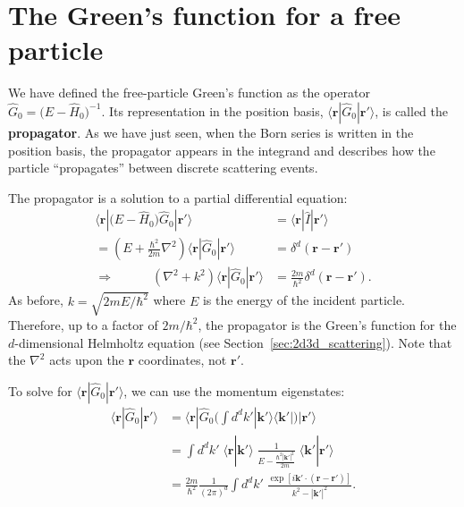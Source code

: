 \documentclass[pra,12pt]{revtex4}
\begin{document}
\section{The Green's function for a free particle}
\label{sec:freegreen}

We have defined the free-particle Green's function as the operator
$\hat{G}_0=\big(E-\hat{H}_0\big)^{-1}$.  Its representation in the
position basis, $\langle\mathbf{r}|\hat{G}_0|\mathbf{r}'\rangle$, is
called the \textbf{propagator}.  As we have just seen, when the Born
series is written in the position basis, the propagator appears in the
integrand and describes how the particle ``propagates'' between
discrete scattering events.

The propagator is a solution to a partial differential equation:
$$\begin{aligned}\langle\mathbf{r} |\big(E-\hat{H}_0\big) \hat{G}_0 |\mathbf{r}'\rangle &= \langle\mathbf{r}|\hat{I}|\mathbf{r}'\rangle \\ = \left(E + \frac{\hbar^2}{2m}\nabla^2 \right) \langle\mathbf{r} |\hat{G}_0 |\mathbf{r}'\rangle &= \delta^d(\mathbf{r}-\mathbf{r}') \\ \Rightarrow \qquad\quad \left(\nabla^2 + k^2\right) \langle\mathbf{r} |\hat{G}_0 |\mathbf{r}'\rangle &= \frac{2m}{\hbar^2} \delta^d(\mathbf{r}-\mathbf{r}').\end{aligned}$$
As before, $k = \sqrt{2mE/\hbar^2}$ where $E$ is the energy of the
incident particle.  Therefore, up to a factor of $2m/\hbar^2$, the
propagator is the Green's function for the $d$-dimensional Helmholtz
equation (see Section~\ref{sec:2d3d_scattering}).  Note that the
$\nabla^2$ acts upon the $\mathbf{r}$ coordinates, not $\mathbf{r}'$.

To solve for $\langle\mathbf{r}|\hat{G}_0|\mathbf{r}'\rangle$, we can
use the momentum eigenstates:
$$\begin{aligned}\langle\mathbf{r}|\hat{G}_0|\mathbf{r}'\rangle &=
  \langle\mathbf{r}|\hat{G}_0 \Big(\int d^dk' |\mathbf{k}'\rangle\langle\mathbf{k}'| \Big) |\mathbf{r}'\rangle \\ &= \int d^dk' \; \langle\mathbf{r}|\mathbf{k}'\rangle \; \frac{1}{E-\frac{\hbar^2|\mathbf{k}'|^2}{2m}} \; \langle\mathbf{k}'|\mathbf{r}'\rangle \\ &= \frac{2m}{\hbar^2} \frac{1}{(2\pi)^d} \int d^dk' \; \frac{\exp\left[i\mathbf{k}' \cdot (\mathbf{r}-\mathbf{r}')\right]}{k^2-|\mathbf{k}'|^2}.\end{aligned}$$
\end{document}
